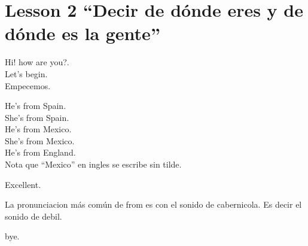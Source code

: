 \section{Lesson 2 ``Decir de dónde eres y de dónde es la gente''}

Hi! how are you?.\\
Let's begin.\\
Empecemos.

He's from Spain.\\
She's from Spain.\\
He's from Mexico.\\
She's from Mexico.\\
He's from England.\\

Nota que ``Mexico'' en ingles se escribe sin tilde.

Excellent.

La pronunciacion más común de from es con el sonido de cabernicola.
Es decir el sonido de debil.

bye.
